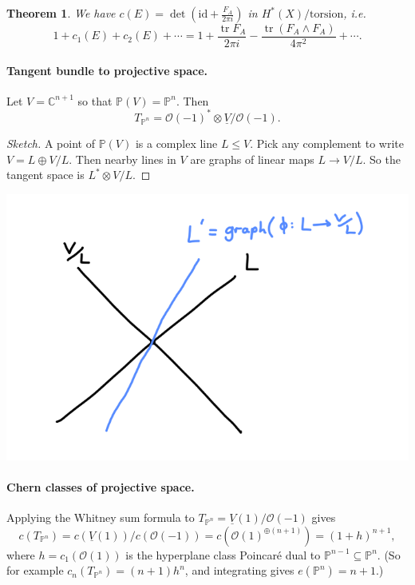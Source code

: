 \documentclass{article}
\newtheorem*{theorem}{Theorem}
\theoremstyle{definition}
\DeclareMathOperator{\tr}{tr}
\newcommand{\id}{\mathrm{id}}
\renewcommand{\O}{\mathcal{O}}
\renewcommand{\P}{\mathbb{P}}
\newcommand{\C}{\mathbb{C}}
\begin{document}

\begin{theorem}
    We have $c(E)=\det(\id+\frac{F_A}{2\pi i})$ in $H^*(X)/\text{torsion}$, i.e.
    \begin{equation*}
        1 + c_1(E) + c_2(E) + \cdots
            = 1 + \frac{\tr F_A}{2\pi i} - \frac{\tr(F_A\wedge F_A)}{4\pi^2}
                + \cdots.
    \end{equation*}
\end{theorem}

\paragraph{Tangent bundle to projective space.}
Let $V=\C^{n+1}$ so that $\P(V)=\P^n$. Then
\begin{equation*}
    T_{\P^n} = \O(-1)^*\otimes\underline V/\O(-1).
\end{equation*}
\begin{proof}[Sketch]
    A point of $\P(V)$ is a complex line $L\le V$. Pick any complement to write
    $V=L\oplus V/L$. Then nearby lines in $V$ are graphs of linear maps
    $L\to V/L$. So the tangent space is $L^*\otimes V/L$.
\end{proof}
\begin{center}
    \includegraphics[scale=0.4]{chern_tangent}
\end{center}

\paragraph{Chern classes of projective space.}
Applying the Whitney sum formula to $T_{\P^n}=\underline V(1)/\O(-1)$ gives
\begin{equation*}
    c(T_{\P^n})
        = c(\underline V(1))/c(\O(-1))
        = c(\O(1)^{\oplus(n+1)})
        = (1+h)^{n+1},
\end{equation*}
where $h=c_1(\O(1))$ is the hyperplane class Poincar\'e dual to
$\P^{n-1}\subseteq\P^n$. (So for example $c_n(T_{\P^n})=(n+1)h^n$, and
integrating gives $e(\P^n)=n+1$.)
\end{document}
